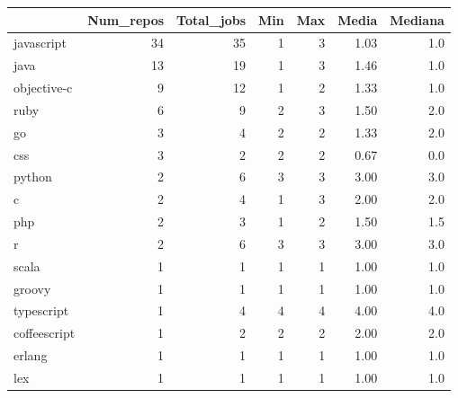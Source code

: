 \begin{tabular}{lrrrrrr}
\toprule
{} &  Num\_repos &  Total\_jobs &  Min &  Max &  Media &  Mediana \\
\midrule
javascript   &         34 &          35 &    1 &    3 &   1.03 &      1.0 \\
java         &         13 &          19 &    1 &    3 &   1.46 &      1.0 \\
objective-c  &          9 &          12 &    1 &    2 &   1.33 &      1.0 \\
ruby         &          6 &           9 &    2 &    3 &   1.50 &      2.0 \\
go           &          3 &           4 &    2 &    2 &   1.33 &      2.0 \\
css          &          3 &           2 &    2 &    2 &   0.67 &      0.0 \\
python       &          2 &           6 &    3 &    3 &   3.00 &      3.0 \\
c            &          2 &           4 &    1 &    3 &   2.00 &      2.0 \\
php          &          2 &           3 &    1 &    2 &   1.50 &      1.5 \\
r            &          2 &           6 &    3 &    3 &   3.00 &      3.0 \\
scala        &          1 &           1 &    1 &    1 &   1.00 &      1.0 \\
groovy       &          1 &           1 &    1 &    1 &   1.00 &      1.0 \\
typescript   &          1 &           4 &    4 &    4 &   4.00 &      4.0 \\
coffeescript &          1 &           2 &    2 &    2 &   2.00 &      2.0 \\
erlang       &          1 &           1 &    1 &    1 &   1.00 &      1.0 \\
lex          &          1 &           1 &    1 &    1 &   1.00 &      1.0 \\
\bottomrule
\end{tabular}
